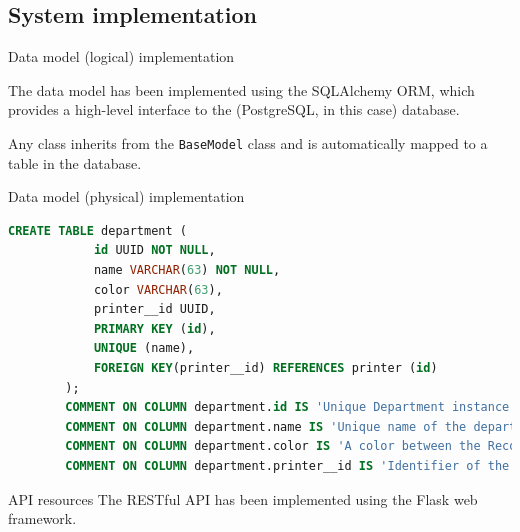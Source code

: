 \subsection{System implementation}

\begin{frame}[allowframebreaks]{Data model (logical) implementation}

	The data model has been implemented using the SQLAlchemy ORM, which
	provides a high-level interface to the (PostgreSQL, in this case) database.

	

	Any class inherits from the \texttt{BaseModel} class and is automatically
	mapped to a table in the database.

	\framebreak

	\vspace*{-1\baselineskip}
	

\end{frame}

\begin{frame}[fragile]{Data model (physical) implementation}
	
	\begin{lstlisting}[language=SQL]
		CREATE TABLE department (
			id UUID NOT NULL,
			name VARCHAR(63) NOT NULL,
			color VARCHAR(63),
			printer__id UUID,
			PRIMARY KEY (id),
			UNIQUE (name),
			FOREIGN KEY(printer__id) REFERENCES printer (id)
		);
		COMMENT ON COLUMN department.id IS 'Unique Department instance identifier';
		COMMENT ON COLUMN department.name IS 'Unique name of the department';
		COMMENT ON COLUMN department.color IS 'A color between the Recognized color keyword names. See also https://www.w3.org/TR/SVG11/types.html#ColorKeywords';
		COMMENT ON COLUMN department.printer__id IS 'Identifier of the printer the department is equipped with';\end{lstlisting}

\end{frame}

\begin{frame}{API resources}
	The RESTful API has been implemented using the Flask web framework.

	

	\framebreak

	\vspace*{-1\baselineskip}
	

\end{frame}

